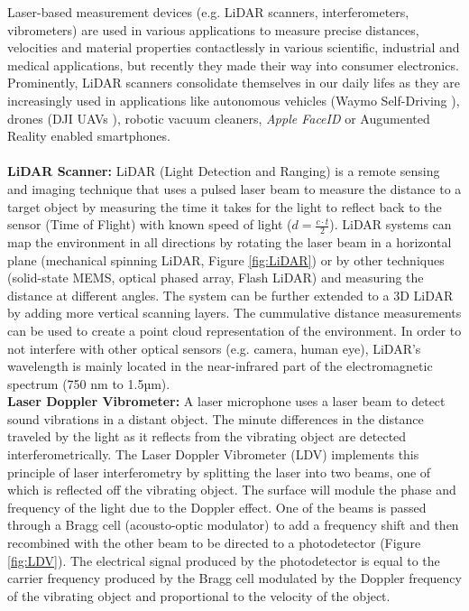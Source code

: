 \documentclass[sigconf, nonacm]{acmart}
\begin{document}
Laser-based measurement devices (e.g. LiDAR scanners, interferometers, vibrometers) are used in various applications to measure precise distances, velocities and material properties contactlessly in various scientific, industrial and medical applications, but recently they made their way into consumer electronics.
Prominently, LiDAR scanners consolidate themselves in our daily lifes as they are increasingly used in applications like autonomous vehicles (Waymo Self-Driving \cite{WaymoDriver}), drones (DJI UAVs \cite{DJIEnterpriseLidar}), robotic vacuum cleaners, \textit{Apple FaceID} or Augumented Reality enabled smartphones.
\\~\\
\textbf{LiDAR Scanner:} LiDAR (Light Detection and Ranging) is a remote sensing and imaging technique that uses a pulsed laser beam to measure the distance to a target object by measuring the time it takes for the light to reflect back to the sensor (Time of Flight) with known speed of light ($d=\frac{c\cdot t}{2}$).
LiDAR systems can map the environment in all directions by rotating the laser beam in a horizontal plane (mechanical spinning LiDAR, Figure \ref{fig:LiDAR}) or by other techniques (solid-state MEMS, optical phased array, Flash LiDAR) and measuring the distance at different angles. The system can be further extended to a 3D LiDAR by adding more vertical scanning layers.
The cummulative distance measurements can be used to create a point cloud representation of the environment.
In order to not interfere with other optical sensors (e.g. camera, human eye), LiDAR's wavelength is mainly located in the near-infrared part of the electromagnetic spectrum (750 nm to 1.5µm).
\\[6pt]
\textbf{Laser Doppler Vibrometer:} A laser microphone uses a laser beam to detect sound vibrations in a distant object. The minute differences in the distance traveled by the light as it reflects from the vibrating object are detected interferometrically. The Laser Doppler Vibrometer (LDV) implements this principle of laser interferometry by splitting the laser into two beams, one of which is reflected off the vibrating object. The surface will module the phase and frequency of the light due to the Doppler effect. One of the beams is passed through a Bragg cell (acousto-optic modulator) to add a frequency shift and then recombined with the other beam to be directed to a photodetector (Figure \ref{fig:LDV}). The electrical signal produced by the photodetector is equal to the carrier frequency produced by the Bragg cell modulated by the Doppler frequency of the vibrating object and proportional to the velocity of the object.
\end{document}
